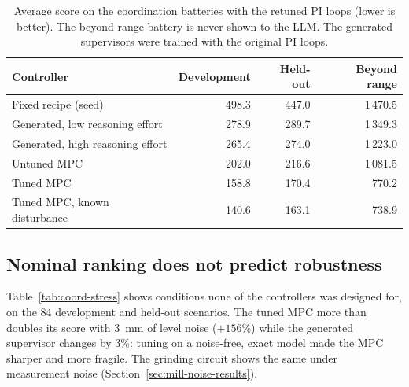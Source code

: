 \begin{table}[tb]
  \centering
  \caption{Average score on the coordination batteries with the retuned PI
    loops (lower is better). The beyond-range battery is never shown to the
    LLM. The generated supervisors were trained with the original PI loops.}
  \label{tab:coord-main}
  \begin{tabular}{@{}lrrr@{}}
    \toprule
    Controller & Development & Held-out & Beyond range \\
    \midrule
    Fixed recipe (seed)                 & 498.3 & 447.0 & 1\,470.5 \\
    Generated, low reasoning effort     & 278.9 & 289.7 & 1\,349.3 \\
    Generated, high reasoning effort    & 265.4 & 274.0 & 1\,223.0 \\
    Untuned MPC                         & 202.0 & 216.6 & 1\,081.5 \\
    Tuned MPC                           & 158.8 & 170.4 &    770.2 \\
    Tuned MPC, known disturbance        & 140.6 & 163.1 &    738.9 \\
    \bottomrule
  \end{tabular}
\end{table}

\subsection{Nominal ranking does not predict robustness}
\label{sec:tank-robustness}
Table~\ref{tab:coord-stress} shows conditions none of the controllers was
designed for, on the 84 development and held-out scenarios. The tuned MPC more
than doubles its score with 3~mm of level noise ($+156\%$) while the generated
supervisor changes by 3\%: tuning on a noise-free, exact model made the MPC
sharper and more fragile. The grinding circuit shows the same under
measurement noise (Section~\ref{sec:mill-noise-results}).

